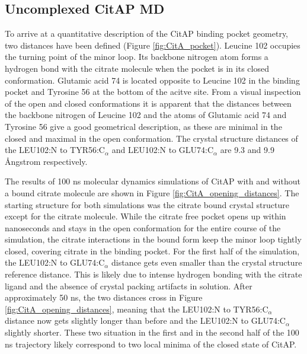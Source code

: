 \documentclass[english, a4paper, 12pt, titlepage, draft]{article}
\begin{document}
\subsection{Uncomplexed CitAP MD}

To arrive at a quantitative description of the CitAP binding pocket geometry, two distances have been defined (Figure \ref{fig:CitA_pocket}).
Leucine 102 occupies the turning point of the minor loop.
Its backbone nitrogen atom forms a hydrogen bond with the citrate molecule when the pocket is in its closed conformation.
Glutamic acid 74 is located opposite to Leucine 102 in the binding pocket and Tyrosine 56 at the bottom of the acitve site.
From a visual inspection of the open and closed conformations it is apparent that the distances between the backbone nitrogen of Leucine 102 and the  atoms of Glutamic acid 74 and Tyrosine 56 give a good geometrical description, as these are minimal in the closed and maximal in the open conformation.
The crystal structure distances of the LEU102:N to TYR56:C$_{\alpha}$ and LEU102:N to GLU74:C$_{\alpha}$ are 9.3 and 9.9 \r{A}ngstrom respectively.

The results of 100 ns molecular dynamics simulations of CitAP with and without a bound citrate molecule are shown in Figure \ref{fig:CitA_opening_distances}.
The starting structure for both simulations was the citrate bound crystal structure except for the citrate molecule.
While the citrate free pocket opens up within nanoseconds and stays in the open conformation for the entire course of the simulation, the citrate interactions in the bound form keep the minor loop tightly closed, covering citrate in the binding pocket.
For the first half of the simulation, the LEU102:N to GLU74:C$_{\alpha}$ distance gets even smaller than the crystal structure reference distance.
This is likely due to intense hydrogen bonding with the citrate ligand and the absence of crystal packing artifacts in solution.
After approximately 50 ns, the two distances cross in Figure \ref{fig:CitA_opening_distances}, meaning that the LEU102:N to TYR56:C$_{\alpha}$ distance now gets slightly longer than before and the LEU102:N to GLU74:C$_{\alpha}$ slightly shorter.
These two situation in the first and in the second half of the 100 ns trajectory likely correspond to two local minima of the closed state of CitAP.
\end{document}
